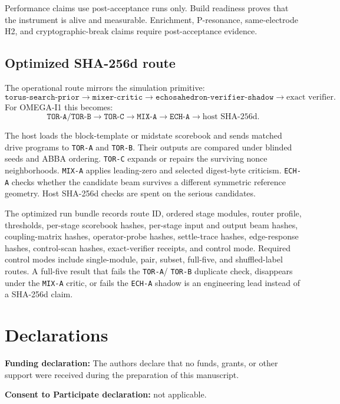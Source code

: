 \documentclass[11pt]{article}
\theoremstyle{definition}
\theoremstyle{remark}
\begin{document}
Performance claims use post-acceptance runs only. Build readiness proves that
the instrument is alive and measurable. Enrichment,
P-resonance, same-electrode H2, and cryptographic-break claims require
post-acceptance evidence.

\subsection{Optimized SHA-256d route}

The operational route mirrors the simulation primitive:
\[
\texttt{torus-search-prior}
\to
\texttt{mixer-critic}
\to
\texttt{echosahedron-verifier-shadow}
\to
\text{exact verifier}.
\]
For OMEGA-I1 this becomes:
\[
\texttt{TOR-A/TOR-B}
\to
\texttt{TOR-C}
\to
\texttt{MIX-A}
\to
\texttt{ECH-A}
\to
\text{host SHA-256d}.
\]

The host loads the block-template or midstate scorebook and sends matched drive
programs to \texttt{TOR-A} and \texttt{TOR-B}. Their outputs are compared under
blinded seeds and ABBA ordering. \texttt{TOR-C} expands or repairs the surviving
nonce neighborhoods. \texttt{MIX-A} applies leading-zero and
selected digest-byte criticism. \texttt{ECH-A} checks whether the candidate beam
survives a different symmetric reference geometry. Host SHA-256d checks are
spent on the serious candidates.

The optimized run bundle records route ID, ordered stage modules, router
profile, thresholds, per-stage scorebook hashes, per-stage input and output beam
hashes, coupling-matrix hashes, operator-probe hashes, settle-trace hashes,
edge-response hashes, control-scan hashes, exact-verifier receipts, and control
mode. Required control modes include single-module, pair, subset, full-five, and
shuffled-label routes. A full-five result that fails the \texttt{TOR-A}/
\texttt{TOR-B} duplicate check, disappears under the \texttt{MIX-A} critic, or
fails the \texttt{ECH-A} shadow is an engineering lead instead of a SHA-256d
claim.

\section*{Declarations}

\noindent\textbf{Funding declaration:} The authors declare that no funds,
grants, or other support were received during the preparation of this
manuscript.

\noindent\textbf{Consent to Participate declaration:} not applicable.
\end{document}
